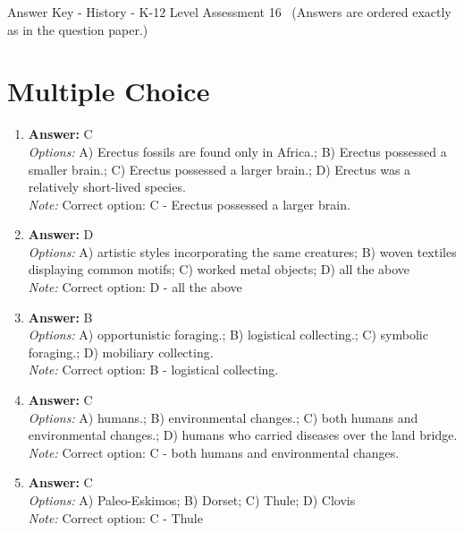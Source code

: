 \documentclass[12pt]{article}
\begin{document}
\begin{center}
Answer Key - History - K-12 Level Assessment 16 \
\small (Answers are ordered exactly as in the question paper.)
\end{center}

\section*{Multiple Choice}
\begin{enumerate}[label=\arabic*.]
\item \textbf{Answer:} C
\\ \textit{Options:} A) Erectus fossils are found only in Africa.; B) Erectus possessed a smaller brain.; C) Erectus possessed a larger brain.; D) Erectus was a relatively short-lived species.
\\ \textit{Note:} Correct option: C - Erectus possessed a larger brain.
\item \textbf{Answer:} D
\\ \textit{Options:} A) artistic styles incorporating the same creatures; B) woven textiles displaying common motifs; C) worked metal objects; D) all the above
\\ \textit{Note:} Correct option: D - all the above
\item \textbf{Answer:} B
\\ \textit{Options:} A) opportunistic foraging.; B) logistical collecting.; C) symbolic foraging.; D) mobiliary collecting.
\\ \textit{Note:} Correct option: B - logistical collecting.
\item \textbf{Answer:} C
\\ \textit{Options:} A) humans.; B) environmental changes.; C) both humans and environmental changes.; D) humans who carried diseases over the land bridge.
\\ \textit{Note:} Correct option: C - both humans and environmental changes.
\item \textbf{Answer:} C
\\ \textit{Options:} A) Paleo-Eskimos; B) Dorset; C) Thule; D) Clovis
\\ \textit{Note:} Correct option: C - Thule
\end{enumerate}
\end{document}
